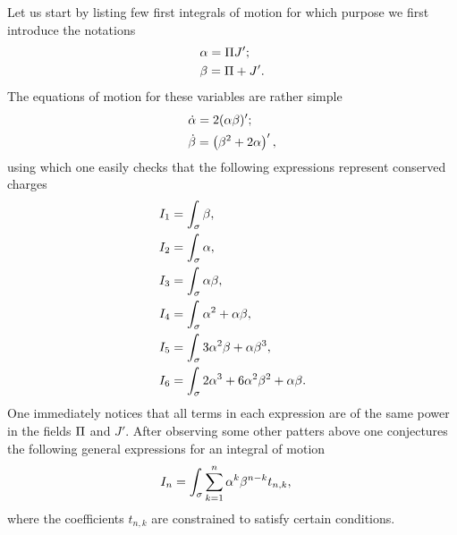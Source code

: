\documentclass[12pt]{article}%
\numberwithin{equation}{section}
\begin{document}
Let us start by listing few first integrals of motion for which purpose we first introduce the notations
\begin{equation}
 \label{a2}
 \begin{split}
  & \a=\P J';\\
  & \b=\P+J'.
 \end{split}
\end{equation}
The equations of motion for these variables are rather simple
\begin{equation}
 \label{a3}
\begin{split}
 & \dot{\a}=2(\a\b)';\\
 & \dot{\b}=\left(\b^2+2\a\right)',
\end{split}
\end{equation}
using which one easily checks that the following expressions represent conserved charges
\begin{equation}
\label{exiom}
\begin{aligned}
I_1&=\int_\s\b,\\
I_2&=\int_\s\a,\\
I_3&=\int_\s\a\b,\\
I_4&=\int_\s\a^2+\a\b,\\
I_5&=\int_\s3\a^2\b+\a\b^3,\\
I_6&=\int_\s2\a^3+6\a^2\b^2+\a\b.
\end{aligned}
\end{equation}
One immediately notices that all terms in each expression are of the same power in the fields $\P$ and $J'$. After observing some other patters above one conjectures the following general expressions for an integral of motion
\begin{equation}
 \label{a4}
\begin{aligned}
I_{n}&=\int_\s\sum_{k=1}^{n}\a^k\b^{n-k}t_{n,k},
\end{aligned}
\end{equation}
where the coefficients $t_{n,k}$ are constrained to satisfy certain conditions. 
\end{document}
